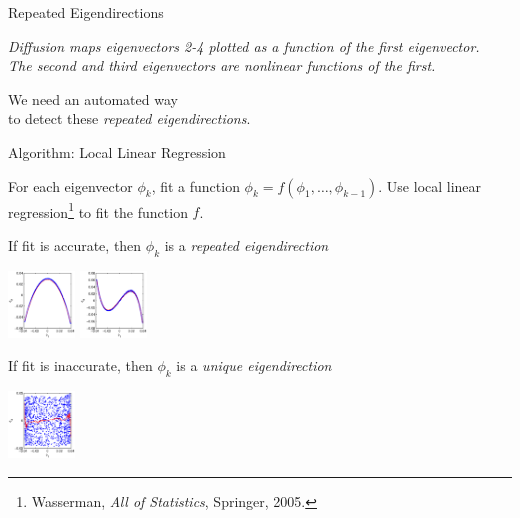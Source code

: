 \documentclass[12pt]{beamer}
\begin{document}
\begin{frame}{Repeated Eigendirections}
{\em \scriptsize Diffusion maps eigenvectors 2-4 plotted as a function of the first eigenvector. \\ The second and third eigenvectors are nonlinear functions of the first. \par}

\vspace{0.1in}

We need an automated way \\ to detect these {\em repeated eigendirections}.

\end{frame}

\begin{frame}{Algorithm: Local Linear Regression}

For each eigenvector $\phi_k$, fit a function $\phi_k = f(\phi_1, \dots, \phi_{k-1})$.
%
 Use local linear regression\footnote{Wasserman, {\em All of Statistics}, Springer, 2005.} to fit the function $f$.

\vspace{0.1in}

\begin{minipage}{0.45\textwidth}
\centering
{\small If fit is accurate, then $\phi_k$ is a {\em repeated eigendirection} \par}

\includegraphics[width=0.7in]{strip_corr_12_fitline}
\includegraphics[width=0.7in]{strip_corr_13_fitline}
\end{minipage}
%
\hfill
%
\begin{minipage}{0.45\textwidth}
\centering
{\small If fit is inaccurate, then $\phi_k$ is a {\em unique eigendirection} \par}

\includegraphics[width=0.7in]{strip_corr_14_fitline}
\end{minipage}


\end{frame}
\end{document}
